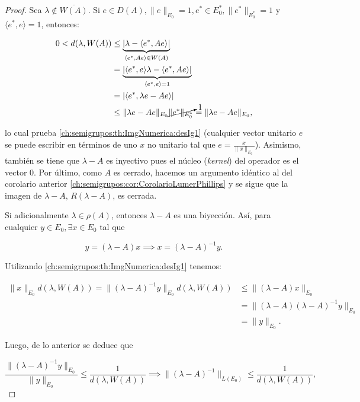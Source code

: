 \begin{proof}
    Sea $\lambda \not \in \overline{W(A)}$. Si $e \in D(A), \lVert e \rVert_{E_0} = 1, e^* \in E^*_0, \lVert e^* \rVert_{E_0^*} = 1$ y $\langle e^*, e \rangle = 1$, entonces:

    \begin{align*}
    0 < d(\lambda, W(A)) &\leq \underbrace{| \lambda - \langle e^*, Ae\rangle |}_{\langle e^*, Ae\rangle \in W(A)}\\
    &= \underbrace{|\langle e^*, e\rangle \lambda - \langle e^*, Ae\rangle|}_{\langle e^*, e\rangle = 1}\\
    &= |\langle e^*, \lambda e - Ae\rangle|\\
    &\leq \lVert \lambda e - Ae \rVert_{E_0} \cancelto{1}{\lVert e^* \rVert_{E^*_0}} = \lVert \lambda e - Ae \rVert_{E_0},
    \end{align*}

    lo cual prueba \eqref{ch:semigrupos:th:ImgNumerica:desIg1} (cualquier vector unitario $e$ se puede escribir en términos de uno $x$ no unitario tal que $e = \frac{x}{\lVert x \rVert_{E_0}}$). Asimismo, también se tiene que $\lambda - A$ es inyectivo pues el núcleo (\textit{kernel}) del operador es el vector $0$. Por último, como $A$ es cerrado, hacemos un argumento idéntico al del corolario anterior \ref{ch:semigrupos:cor:CorolarioLumerPhillips} y se sigue que la imagen de $\lambda - A$, $R(\lambda - A)$, es cerrada. 
    
    Si adicionalmente $\lambda \in \rho(A)$, entonces $\lambda -A$ es una biyección. Así, para cualquier $y \in E_0, \exists x \in E_0$ tal que

    \[y = (\lambda - A)x \implies x = (\lambda - A)^{-1}y.\]

    Utilizando \eqref{ch:semigrupos:th:ImgNumerica:desIg1} tenemos:

    \begin{align*}
        \lVert x \rVert_{E_0}d(\lambda, W(A)) = \lVert (\lambda -A)^{-1}y\rVert_{E_0} d(\lambda, W(A)) &\leq \lVert (\lambda - A)x \rVert_{E_0}\\
        &= \lVert (\lambda - A)(\lambda - A)^{-1}y \rVert_{E_0}\\
        &= \lVert y \rVert_{E_0}.
    \end{align*}

    Luego, de lo anterior se deduce que

    \[\frac{\lVert (\lambda -A)^{-1}y\rVert_{E_0}}{\lVert y \rVert_{E_0}} \leq \frac{1}{d(\lambda, W(A))} \implies \lVert (\lambda - A)^{-1}\rVert_{L(E_0)} \leq \frac{1}{d(\lambda, W(A))},\]


\end{proof}
